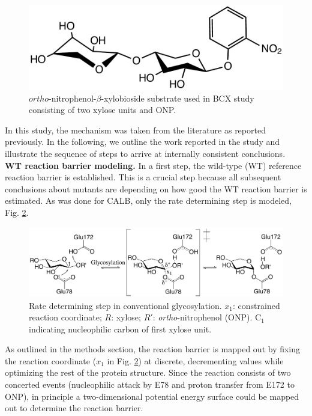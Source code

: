 \begin{figure}[htbp] 
\centering
\includegraphics[width=0.85\linewidth]{substrate.pdf}
\caption{
$ortho$-nitrophenol-$\beta$-xylobioside substrate used in BCX study consisting of two xylose units and ONP.
}
\label{fig:substrate}
\end{figure}
In this study, the mechanism was taken from the literature as reported previously\cite{joshi2000hydrogen,joshi2001dissecting}.
In the following, we outline the work reported in the study and illustrate the sequence of steps to arrive at internally consistent conclusions.\\
\textbf{WT reaction barrier modeling.}
In a first step, the wild-type (WT) reference reaction barrier is established.
This is a crucial step because all subsequent conclusions about mutants are depending on how good the WT reaction barrier is estimated.
As was done for CALB, only the rate determining step is modeled, Fig. \ref{fig:bcx_mechanism}.
\begin{figure}[htbp] 
\centering
\includegraphics[width=1.0\linewidth]{mechanism.pdf}
\caption{
Rate determining step in conventional glycosylation. $x_1$: constrained reaction coordinate; $R$: xylose; 
$R'$: \textit{ortho}-nitrophenol (ONP).
C$_1$ indicating nucleophilic carbon of first xylose unit\cite{hediger2013computational}.
}
\label{fig:bcx_mechanism}
\end{figure}
As outlined in the methods section, the reaction barrier is mapped out by fixing the reaction coordinate ($x_1$ in Fig. \ref{fig:bcx_mechanism}) at discrete, decrementing values while optimizing the rest of the protein structure.
Since the reaction consists of two concerted events (nucleophilic attack by E78 and proton transfer from E172 to ONP), in principle a two-dimensional potential energy surface could be mapped out to determine the reaction barrier.
